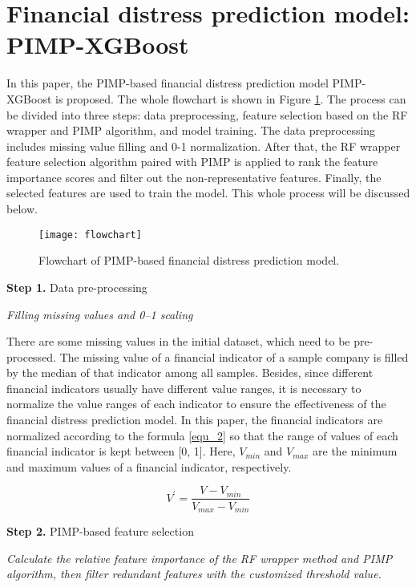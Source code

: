 \documentclass[review]{elsarticle}
\begin{document}
\section{Financial distress prediction model: PIMP-XGBoost}
\label{section_3}
In this paper, the PIMP-based financial distress prediction model PIMP-XGBoost is proposed. The whole flowchart is shown in Figure \ref{fig: flowchart}. The process can be divided into three steps: data preprocessing, feature selection based on the RF wrapper and PIMP algorithm, and model training. The data preprocessing includes missing value filling and 0-1 normalization. After that, the RF wrapper feature selection algorithm paired with PIMP is applied to rank the feature importance scores and filter out the non-representative features. Finally, the selected features are used to train the model. This whole process will be discussed below.

\begin{figure}[H]
    \centering
    \texttt{[image: flowchart]}
    \caption{Flowchart of PIMP-based financial distress prediction model.}
    \label{fig: flowchart}
\end{figure}

\textbf{Step 1.} Data pre-processing

\textit{Filling missing values and 0–1 scaling}

There are some missing values in the initial dataset, which need to be pre-processed. The missing value of a financial indicator of a sample company is filled by the median of that indicator among all samples. Besides, since different financial indicators usually have different value ranges, it is necessary to normalize the value ranges of each indicator to ensure the effectiveness of the financial distress prediction model. In this paper, the financial indicators are normalized according to the formula \ref{equ_2} so that the range of values of each financial indicator is kept between [0, 1]. Here, $V_{min}$ and $V_{max}$ are the minimum and maximum values of a financial indicator, respectively.

\begin{equation} \label{equ_2}
    V^{'}=\frac{V-V_{min}}{V_{max}-V_{min}}
\end{equation}

\textbf{Step 2.} PIMP-based feature selection

\textit{Calculate the relative feature importance of the RF wrapper method and PIMP algorithm, then filter redundant features with the customized threshold value.}
\end{document}
